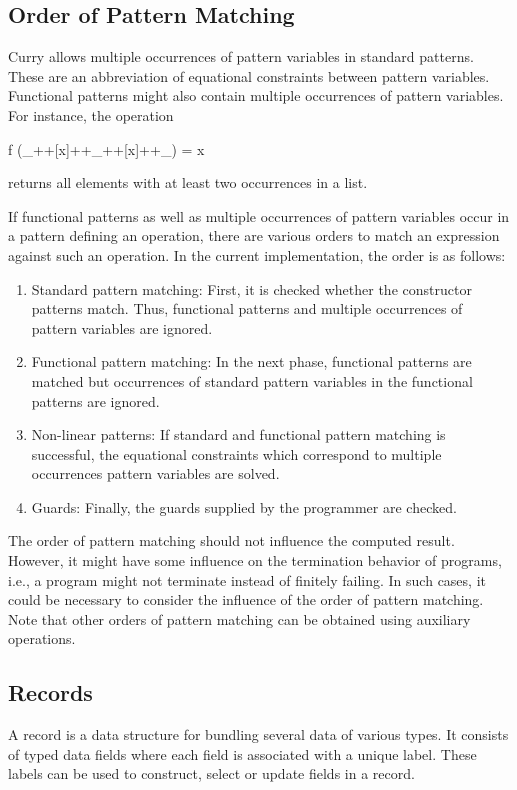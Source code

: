 \documentclass[11pt,fleqn]{article}
\begin{document}
\subsection{Order of Pattern Matching}

Curry allows multiple occurrences of pattern variables
in standard patterns. These are an abbreviation of equational constraints
between pattern variables.
Functional patterns might also contain multiple occurrences of
pattern variables.
For instance, the operation
\begin{curry}
f (_++[x]++_++[x]++_) = x
\end{curry}
returns all elements with at least two occurrences in a list.

If functional patterns as well as multiple occurrences of
pattern variables occur in a pattern defining an operation,
there are various orders to match an expression against such
an operation. In the current implementation, the order
is as follows:
\begin{enumerate}
\item Standard pattern matching: First, it is checked whether
the constructor patterns match. Thus, functional patterns
and multiple occurrences of pattern variables are ignored.
\item Functional pattern matching: In the next phase,
functional patterns are matched but occurrences of standard
pattern variables in the functional patterns are ignored.
\item Non-linear patterns: If standard and functional pattern matching
is successful, the equational constraints which correspond
to multiple occurrences pattern variables are solved.
\item Guards: Finally, the guards supplied by the programmer
are checked.
\end{enumerate}
The order of pattern matching should not influence the computed
result. However, it might have some influence on the termination
behavior of programs, i.e., a program might not terminate
instead of finitely failing.
In such cases, it could be necessary to consider the influence
of the order of pattern matching. Note that other orders of pattern matching
can be obtained using auxiliary operations.



\subsection {Records}
\label{records}

A record is a data structure for bundling several data of various types.
It consists of typed data fields where each field is associated with
a unique label. These labels can be used to construct, select or update
fields in a record.
\end{document}
